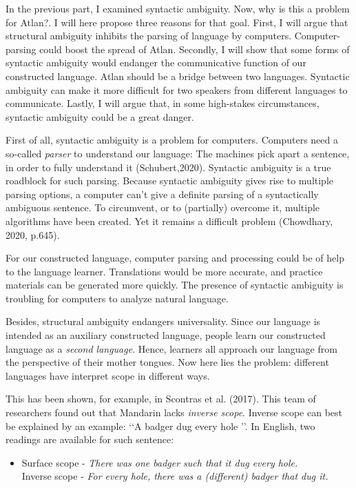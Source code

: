 \noindent In the previous part, I examined syntactic ambiguity. Now, why is this a problem for Atlan?. I will here propose three reasons for that goal. First, I will argue that structural ambiguity inhibits the parsing of language by computers. Computer-parsing could boost the spread of Atlan. Secondly, I will show that some forms of syntactic ambiguity would endanger the communicative function of our constructed language. Atlan should be a bridge between two languages. Syntactic ambiguity can make it more difficult for two speakers from different languages to communicate.  Lastly, I will argue that, in some high-stakes circumstances, syntactic ambiguity could be a great danger.

First of all, syntactic ambiguity is a problem for computers. Computers need a so-called {\it parser} to understand our language: The machines pick apart a sentence, in order to fully understand it (Schubert,2020). Syntactic ambiguity is a true roadblock for such parsing. Because syntactic ambiguity gives rise to multiple parsing options, a computer can't give a definite parsing of a syntactically ambiguous sentence. To circumvent, or to (partially) overcome it, multiple algorithms have been created. Yet it remains a difficult problem (Chowdhary, 2020, p.645).

For our constructed language, computer parsing and processing could be of help to the language learner. Translations would be more accurate, and practice materials can be generated more quickly. The presence of syntactic ambiguity is troubling for computers to analyze natural language.

Besides, structural ambiguity endangers universality. Since our language is intended as an auxiliary constructed language, people learn our constructed language as a {\it second language}. Hence, learners all approach our language from the perspective of their mother tongues. Now here lies the problem: different languages have interpret scope in different ways.

This has been shown, for example, in Scontras et al. (2017). This team of researchers found  out that Mandarin lacks \textit{inverse scope}. Inverse scope can best be explained by an example: \lq\lq A badger dug every hole \rq\rq. In English, two readings are available for such sentence:

\begin{itemize}
	\item[]Surface scope - {\it There was one badger such that it dug every hole.}\\
		Inverse scope - {\it For every hole, there was a (different) badger that dug it.}
\end{itemize}
	
